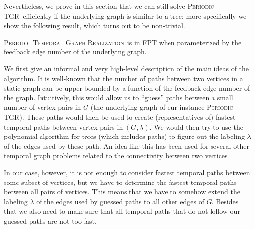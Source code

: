 \documentclass[a4paper,UKenglish,cleveref, autoref, thm-restate, anonymous]{lipics-v2021}
\newcommand{\deltaExactLong}{\textsc{Periodic Temporal Graph Realization}}
\newcommand{\deltaExact}{\textsc{Periodic TGR}}
\begin{document}
Nevertheless, we prove in this section that we can still solve \deltaExact\ efficiently if the underlying graph is similar to a tree; more specifically we show the following result, which turns out to be non-trivial.

\begin{theorem}\label{thm:FPTwrtFES}
    \deltaExactLong\ is in FPT when parameterized by the feedback edge number of the underlying graph.
\end{theorem}

We first give an informal and very high-level description of the main ideas of the algorithm. It is well-known that the number of paths between two vertices in a static graph can be upper-bounded by a function of the feedback edge number of the graph. Intuitively, this would allow us to ``guess'' paths between a small number of vertex pairs in $G$ (the underlying graph of our instance \deltaExact). These paths would then be used to create (representatives of) fastest temporal paths between vertex pairs in $(G,\lambda)$. We would then try to use the polynomial algorithm for trees (which includes paths) to figure out the labeling $\lambda$ of the edges used by these path. An idea like this has been used for several other temporal graph problems related to the connectivity between two vertices~\cite{casteigts2021finding,FMNR22a,EMM22}.

In our case, however, it is not enough to consider fastest temporal paths between some subset of vertices, but we have to determine the fastest temporal paths between all pairs of vertices. This means that we have to somehow extend the labeling $\lambda$ of the edges used by guessed paths to all other edges of $G$.
Besides that we also need to make sure that all temporal paths that do not follow our guessed paths are not too fast. 
\end{document}
